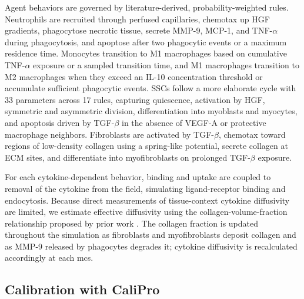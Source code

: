 \documentclass[10pt,letterpaper]{article}
\begin{document}
Agent behaviors are governed by literature-derived, probability-weighted rules. Neutrophils are recruited through perfused capillaries, chemotax up HGF gradients, phagocytose necrotic tissue, secrete MMP-9, MCP-1, and TNF-$\alpha$ during phagocytosis, and apoptose after two phagocytic events or a maximum residence time. Monocytes transition to M1 macrophages based on cumulative TNF-$\alpha$ exposure or a sampled transition time, and M1 macrophages transition to M2 macrophages when they exceed an IL-10 concentration threshold or accumulate sufficient phagocytic events. SSCs follow a more elaborate cycle with 33 parameters across 17 rules, capturing quiescence, activation by HGF, symmetric and asymmetric division, differentiation into myoblasts and myocytes, and apoptosis driven by TGF-$\beta$ in the absence of VEGF-A or protective macrophage neighbors. Fibroblasts are activated by TGF-$\beta$, chemotax toward regions of low-density collagen using a spring-like potential, secrete collagen at ECM sites, and differentiate into myofibroblasts on prolonged TGF-$\beta$ exposure.

For each cytokine-dependent behavior, binding and uptake are coupled to removal of the cytokine from the field, simulating ligand-receptor binding and endocytosis. Because direct measurements of tissue-context cytokine diffusivity are limited, we estimate effective diffusivity using the collagen-volume-fraction relationship proposed by prior work \cite{urciuolo2013collagen}. The collagen fraction is updated throughout the simulation as fibroblasts and myofibroblasts deposit collagen and as MMP-9 released by phagocytes degrades it; cytokine diffusivity is recalculated accordingly at each mcs.

\subsection{Calibration with CaliPro}
\end{document}
